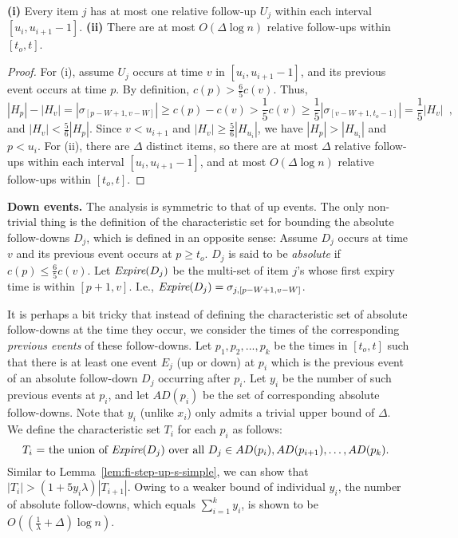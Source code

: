 \documentclass[proceedings]{stacs}
\theoremstyle{definition}\newtheorem{fact}{Fact}
\newcommand{\ei}{\mbox{\it Expire}}
\newcommand{\ns}{c}
\begin{document}
\begin{lemma}\label{lem:fi-type2-up}
{\bf (i)} Every item $j$ has at most one relative follow-up $U_j$
within each interval $[u_i, u_{i+1}-1]$.
{\bf (ii)} There are at most $O( \Delta \log n)$
relative follow-ups within $[t_o, t]$.
\end{lemma}
\begin{proof}
For (i), assume $U_j$ occurs at time $v$ in $[u_i, u_{i+1}-1]$, and its previous event
occurs at time $p$.
By definition, $\ns(p) > \frac{6}{5}\ns(v)$. Thus,
$$\textstyle
|H_p| - |H_v|
= | \sigma_{[p-W+1, v-W]} |
\ge \ns(p) - \ns(v) > \frac{1}{5} \ns(v)
\ge \frac{1}{5}| \sigma_{[v-W+1, t_o-1]}| = \frac{1}{5}|H_v| \enspace,
$$
and $|H_v| < \frac{5}{6} |H_p|$.
Since  $v < u_{i+1}$ and $|H_v| \ge \frac{5}{6}|H_{u_i}|$,
we have $|H_p| > |H_{u_i}|$ and $p < u_i$.
For (ii), there are $\Delta$ distinct items, so there
are at most $\Delta$ relative follow-ups
within each interval $[u_i, u_{i+1}-1]$,
and  at most $O(\Delta \log n)$ relative follow-ups within $[t_o, t]$.
\end{proof}

{\bf Down events.} The analysis is symmetric to that
of up events. The only non-trivial thing is the definition of the
characteristic set for
bounding the absolute follow-downs $D_j$, which
is defined in an opposite sense:
Assume $D_j$ occurs at time $v$ and its  previous event occurs at $p \ge t_o$.
$D_j$ is said to be {\em absolute}
if $\ns(p) \le \frac{6}{5} \ns(v)$.
Let $\ei(D_j)$ be
the multi-set of item $j$'s whose first expiry time is within
$[p+1,v]$. I.e., $\ei(D_j) = \sigma_{j,[p-W+1, v-W]}$.


It is perhaps a bit tricky that
instead of defining the characteristic set of absolute follow-downs
at the time they occur,
we consider the times of the corresponding
\emph{previous events} of these follow-downs.
Let $p_1, p_2, ..., p_{k}$ be the times in $[t_o, t]$ such that
there is at least one event $E_j$ (up or down) at $p_i$ which is the
previous event of an absolute follow-down $D_j$ occurring after $p_i$.
Let $y_i$ be the number of such previous events at $p_i$, and
let $AD(p_i)$ be the set of corresponding absolute follow-downs.
Note that $y_i$ (unlike $x_i$) only admits
a trivial upper bound of $\Delta$.
We define
the characteristic set $T_i$ for each $p_i$ as follows:
$$\mbox{$T_i$ = the union of $\ei(D_j)$ over all
$D_j \in AD(p_i), AD(p_{i+1}), \dots, AD(p_k)$.
}$$
Similar to Lemma~\ref{lem:fi-step-up-s-simple}, we can show
that $|T_{i}| > (1 + 5 y_i \lambda) |T_{i+1}|$. Owing to a weaker bound of individual $y_i$, the number
of absolute follow-downs, which equals
$\sum_{i=1}^{k} y_i$, is shown to be
$O((\frac{1}{\lambda} + \Delta) \log n)$.
\end{document}
